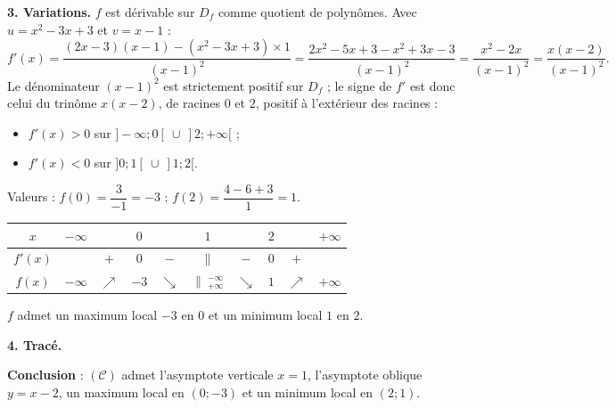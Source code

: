 \documentclass[11pt]{article}
\newcommand{\legende}[1]{\par\vspace{6pt}{\popsemi\fontsize{9}{11.5}\selectfont\color{popmuted}#1}}
\begin{document}
\begin{exoresolu}[Étude de $f(x)=\dfrac{x^2-3x+3}{x-1}$ (type Bac A)]
\textbf{3. Variations.} $f$ est dérivable sur $D_f$ comme quotient de polynômes. Avec $u=x^2-3x+3$ et $v=x-1$ :
\[
f'(x)=\frac{(2x-3)(x-1)-(x^2-3x+3)\times 1}{(x-1)^2}
=\frac{2x^2-5x+3-x^2+3x-3}{(x-1)^2}
=\frac{x^2-2x}{(x-1)^2}
=\frac{x(x-2)}{(x-1)^2}.
\]
Le dénominateur $(x-1)^2$ est strictement positif sur $D_f$ ; le signe de $f'$ est donc celui du trinôme $x(x-2)$, de racines $0$ et $2$, positif à l'extérieur des racines :
\begin{itemize}
\item $f'(x)>0$ sur $]-\infty;0[\ \cup\ ]2;+\infty[$ ;
\item $f'(x)<0$ sur $]0;1[\ \cup\ ]1;2[$.
\end{itemize}
Valeurs : $f(0)=\dfrac{3}{-1}=-3$ ; $f(2)=\dfrac{4-6+3}{1}=1$.
\begin{center}
\begin{tabular}{|c|ccccccccc|}
\hline
$x$ & $-\infty$ & & $0$ & & $1$ & & $2$ & & $+\infty$ \\
\hline
$f'(x)$ & & $+$ & $0$ & $-$ & $\|$ & $-$ & $0$ & $+$ & \\
\hline
$f(x)$ & $-\infty$ & $\nearrow$ & $-3$ & $\searrow$ & $\|\ ^{-\infty}_{+\infty}$ & $\searrow$ & $1$ & $\nearrow$ & $+\infty$ \\
\hline
\end{tabular}
\end{center}
$f$ admet un maximum local $-3$ en $0$ et un minimum local $1$ en $2$.

\textbf{4. Tracé.}
\begin{popfigure}
\begin{center}
\end{center}
\legende{Courbe de $f$ et ses deux asymptotes}
\end{popfigure}
\textbf{Conclusion} : $(\mathcal{C})$ admet l'asymptote verticale $x=1$, l'asymptote oblique $y=x-2$, un maximum local en $(0;-3)$ et un minimum local en $(2;1)$.
\end{exoresolu}
\end{document}
